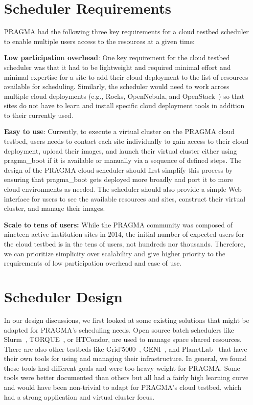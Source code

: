 \documentclass{acm_proc_article-sp}
\begin{document}
\section{Scheduler Requirements}

PRAGMA had the following three key requirements for a cloud testbed scheduler to enable multiple users access to the resources at a  given time:

\textbf{Low participation overhead}:  One key requirement for the cloud testbed scheduler was that it had to be lightweight and required  minimal effort and minimal expertise for a site to add their cloud deployment to the list of resources available for scheduling.   Similarly, the scheduler would need to work across multiple cloud deployments (e.g., Rocks, OpenNebula, and OpenStack~\cite{openstack}) so that sites do not have to learn and install specific cloud deployment tools in addition to their currently used.  

\textbf{Easy to use}:  Currently, to execute a virtual cluster on the PRAGMA cloud testbed, users needs to contact each site individually to gain access to their cloud deployment, upload their images, and launch their virtual cluster either using pragma\_boot  if it is available or manually via a sequence of defined steps.   The design of the PRAGMA cloud scheduler should first simplify this process by ensuring that pragma\_boot gets deployed more broadly and port it to more cloud environments as needed.   The scheduler should also provide a simple Web interface for users to see the available resources and sites, construct their virtual cluster, and manage their images.

\textbf{Scale to tens of users:}  While the PRAGMA community was composed of nineteen active institution sites in 2014, the initial number of expected users for the cloud testbed is in the tens of users, not hundreds nor thousands.  Therefore, we can prioritize simplicity over scalability and give higher priority to the requirements of low participation overhead and ease of use.

\section{Scheduler Design}
\label{Sec:Design}

In our design discussions, we first looked at some existing solutions that might be adapted for PRAGMA's scheduling needs.  Open source batch schedulers like Slurm~\cite{slurm}, TORQUE~\cite{torque}, or HTCondor, are used to manage space shared resources.  There are also other testbeds like Grid'5000~\cite{grid5000},  GENI~\cite{geni}, and PlanetLab~\cite{planetlab} that have their own tools for using and managing their infrastructure. In general, we found these tools had different goals and were too heavy weight for PRAGMA.  Some tools were better documented than others but all had a fairly high learning curve and would have been non-trivial to adapt for PRAGMA's cloud testbed, which had a strong application and virtual cluster focus.
\end{document}
